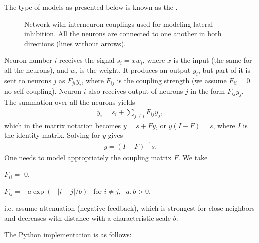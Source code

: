 \documentclass[letterpaper,10pt,english]{jupyterBook}
\let\sphinxpxdimen\pdfpxdimen\else\newdimen\sphinxpxdimen
\begin{document}
\sphinxAtStartPar
The type of models as presented below is known as the .

\begin{figure}[htbp]
\centering
\capstart

\noindent\sphinxincludegraphics[width=220\sphinxpxdimen]{{lat3}.png}
\caption{Network with inter\sphinxhyphen{}neuron couplings used for modeling lateral inhibition. All the neurons are connected to one another in both directions (lines without arrows).}\label{\detokenize{docs/som:lat-fig}}\end{figure}

\sphinxAtStartPar
Neuron number \(i\) receives the signal \(s_i = x w_i\), where \(x\) is the input (the same for all the neurons), and \(w_i\) is the weight. It produces an output \(y_i\), but part of it is sent to neurons \(j\) as \(F_{ji} y_i\), where \(F_{ij}\) is the coupling strength (we assume \(F_{ii}=0\) \sphinxhyphen{} no self coupling). Neuron \(i\) also receives output of neurons \(j\) in the form \(F_{ij} y_j\). The summation over all the neurons yields
\begin{equation*}
\begin{split} 
y_i = s_i + \sum_{j\neq i} F_{ij} y_j, 
\end{split}
\end{equation*}
\sphinxAtStartPar
which in the matrix notation becomes \( y = s + F y\), or \(y(I-F)=s\), where \(I\) is the identity matrix. Solving for \(y\) gives
\begin{equation}\label{equation:docs/som:eq-lat}
\begin{split}y= (I-F)^{-1} s.\end{split}
\end{equation}
\sphinxAtStartPar
One needs to model appropriately the coupling matrix \(F\). We take

\sphinxAtStartPar
\( F_ {ii} = \) 0,

\sphinxAtStartPar
\( F_ {ij} = - a \exp (- | i-j | / b) ~~ \) for \( i \neq j \), \( ~~ a, b> 0 \),

\sphinxAtStartPar
i.e. assume attenuation (negative feedback), which is strongest for close neighbors and decreases with distance with a characteristic scale \(b\).

\sphinxAtStartPar
The Python implementation is as follows:
\end{document}
